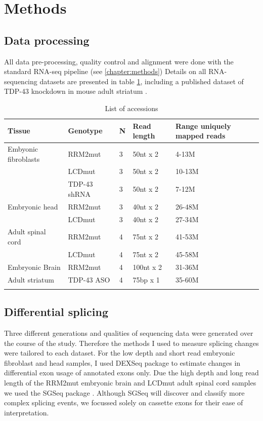 \section{Methods}

\subsection{Data processing}

All data pre-processing, quality control and alignment were done with the standard RNA-seq pipeline (see \autoref{chapter:methods})
Details on all RNA-sequencing datasets are presented in table \ref{table:tdp_mice_sequencing}, including a published dataset of TDP-43 knockdown in mouse adult striatum \citep{Polymenidou2011}.

\begin{table}[h!]
	\caption{List of accessions}
	\begin{footnotesize}
		\begin{tabular}{lllll}
			Tissue & Genotype & N &	Read length & Range uniquely mapped reads\\
			\hline	
			Embyonic fibroblasts & RRM2mut &3 &50nt	x 2 & 4-13M\\
			& LCDmut & 3 & 50nt	x	2 & 10-13M\\
			& TDP-43 shRNA & 3 & 50nt x 2 & 7-12M\\
			Embryonic head & RRM2mut & 3 & 40nt	x	2 & 26-48M\\
			& LCDmut & 3 & 40nt	x 2 & 27-34M \\
			Adult	spinal	cord & RRM2mut & 4 & 75nt x	2 & 41-53M\\
			& LCDmut & 4 & 75nt x 2 & 45-58M\\
			Embryonic	Brain	& RRM2mut & 4 & 100nt x 2 & 31-36M\\
			Adult striatum & TDP-43 ASO & 4 & 75bp x 1 & 35-60M\\
			\citep{Polymenidou2011-hs}
		\end{tabular}
	\end{footnotesize}
	\label{table:tdp_mice_sequencing}
\end{table}


\subsection{Differential splicing}
Three different generations and qualities of sequencing data were generated over the course of the study.  Therefore the methods I  used  to  measure  splicing  changes  were  tailored to each dataset. 
For the low depth and short read embryonic fibroblast and head samples, I used DEXSeq package \citep{Anders2012} to estimate changes in differential exon usage of annotated exons only.
Due the high depth and long read length of the RRM2mut embryonic brain and LCDmut adult spinal cord samples we used the SGSeq package \citep{Goldstein2016}.
Although SGSeq will discover and classify more complex splicing events, we focussed solely on cassette exons for their ease of interpretation.

